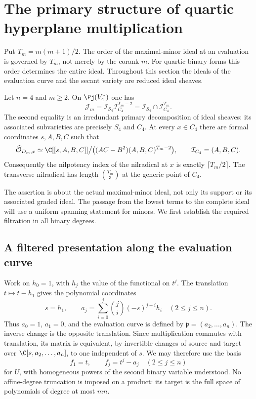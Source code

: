\section{The primary structure of quartic hyperplane multiplication}
\label{sec:quartic-primary}
Put $T_m=m(m+1)/2$. The order of the maximal-minor ideal at an
evaluation is governed by $T_m$, not merely by the corank $m$.
For quartic binary forms this order determines the entire ideal.
Throughout this section the ideals of the evaluation curve and the
secant variety are reduced ideal sheaves.

\begin{theorem}
\label{thm:quartic-primary}
Let $n=4$ and $m\ge2$. On $\Pj(V_4^*)$ one has
\begin{equation}\label{eq:quartic-primary-ideal}
 \mathcal J_m
 =\mathcal I_{S_4}\mathcal I_{C_4}^{T_m-2}
 =\mathcal I_{S_4}\cap\mathcal I_{C_4}^{T_m}.
\end{equation}
The second equality is an irredundant primary decomposition of ideal
sheaves: its associated subvarieties are precisely $S_4$ and $C_4$.
At every $x\in C_4$ there are formal coordinates $s,A,B,C$ such that
\begin{equation}\label{eq:quartic-complete-germ}
 \widehat{\mathcal O}_{D_m,x}
 \simeq
 \C[[s,A,B,C]]\big/
       \big((AC-B^2)(A,B,C)^{T_m-2}\big),
 \qquad \mathcal I_{C_4}=(A,B,C).
\end{equation}
Consequently the nilpotency index of the nilradical at $x$ is exactly
$\lceil T_m/2\rceil$. The transverse nilradical has length
$\binom{T_m}{3}$ at the generic point of $C_4$.
\end{theorem}

The assertion is about the actual maximal-minor ideal, not only its
support or its associated graded ideal. The passage from the lowest
terms to the complete ideal will use a uniform spanning statement
for minors. We first establish the required filtration in all binary
degrees.

\subsection{A filtered presentation along the evaluation curve}
Work on $h_0=1$, with $h_j$ the value of the functional on $t^j$.
The translation $t\mapsto t-h_1$ gives the polynomial coordinates
\[
 s=h_1,\qquad
 a_j=\sum_{i=0}^j\binom ji(-s)^{j-i}h_i\quad(2\le j\le n).
\]
Thus $a_0=1$, $a_1=0$, and the evaluation curve is defined by
$\mathfrak p=(a_2,\ldots,a_n)$. The inverse change is the opposite
translation. Since multiplication commutes with translation, its
matrix is equivalent, by invertible changes of source and target
over $\C[s,a_2,\ldots,a_n]$, to one independent of $s$. We may therefore
use the basis
\begin{equation}\label{eq:centered-hyperplane-basis}
 f_1=t,\qquad f_j=t^j-a_j\quad(2\le j\le n)
\end{equation}
for $U$, with homogeneous powers of the second binary variable
understood. No affine-degree truncation is imposed on a product:
its target is the full space of polynomials of degree at most $mn$.

